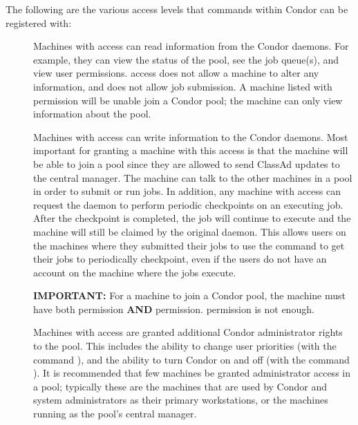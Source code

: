 The following are the various access levels that commands within
Condor can be registered with:

\begin{description}

\item[] \label{dcperm:read} Machines with 
   access can read information from the Condor daemons.  For example, they can
   view the status of the pool, see the job queue(s), and view user
   permissions.   access does not allow a machine to
   alter any information, and does not allow
   job submission. A machine listed
   with  permission will be unable join a Condor pool; the machine can
   only view information about the pool.

\item[] \label{dcperm:write} Machines with
    access can write information to the Condor daemons.
   Most important for granting a machine with this access is that the machine
   will be able to join a pool since they are allowed to send ClassAd
   updates to the central manager.
   The machine can talk to the other machines
   in a pool in order to submit or run jobs.
   In addition, any machine with
    access can request the  daemon to perform
   periodic checkpoints on an executing job. After the
   checkpoint is completed, the job will continue to execute and the
   machine will still be claimed by the original  daemon.
   This allows users on the machines where they submitted their jobs
   to use the  command to get their jobs to
   periodically checkpoint, even if the users do not have an account on the
   machine where the jobs execute.

   \textbf{IMPORTANT:} For a machine to join a Condor pool, the machine must
   have both  permission \textbf{AND}  permission.
    permission is not enough.

\item[] \label{dcperm:administrator} Machines
   with  access are granted additional Condor
   administrator rights to the pool.  This includes the ability to
   change user priorities (with the command ),
   and the ability to turn Condor on and off
   (with the command ).
   It is recommended that few machines be granted administrator access in a pool;
   typically these are the machines that are used by Condor and system
   administrators as their primary workstations,
   or the machines running as the pool's central manager.


\end{description}
